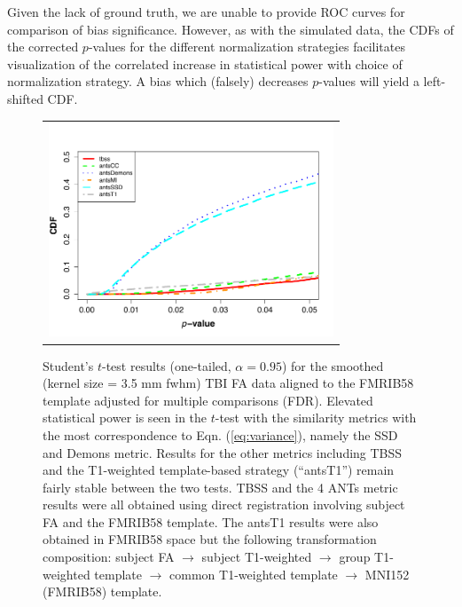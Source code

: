\documentclass[final,5p,times,twocolumn]{elsarticle}
\begin{document}
Given the lack 
of ground truth, we are unable to provide ROC curves for comparison
of bias significance. However, as with the simulated data, the CDFs of the 
corrected $p$-values 
for the different normalization
strategies facilitates visualization of the correlated increase in statistical
power with choice of normalization strategy.
A bias which (falsely) decreases $p$-values will yield a left-shifted
CDF.  


 


\begin{figure}
\begin{center}
\begin{tabular}{c}
  \includegraphics[width=85mm]{tbittest.pdf}
\end{tabular}
\caption{Student's $t$-test results (one-tailed, $\alpha = 0.95$) for the smoothed (kernel size = 3.5 mm fwhm)
TBI FA data aligned to the FMRIB58 template adjusted for multiple comparisons (FDR).  Elevated statistical power is seen in the $t$-test with the similarity metrics with the most correspondence to Eqn. (\ref{eq:variance}), namely the SSD and Demons metric.  Results for the other metrics including TBSS and the T1-weighted template-based strategy (``antsT1'') remain fairly stable between the two tests.    TBSS and the 4 ANTs metric
results were all obtained using direct registration involving subject FA and the FMRIB58 template.  The antsT1 results were also obtained in FMRIB58 space but the following transformation composition: subject FA $\rightarrow$ subject T1-weighted $\rightarrow$ group T1-weighted template $\rightarrow$ 
common T1-weighted template $\rightarrow$ MNI152 (FMRIB58) template.  
}
\label{fig:tbi_testing}
\end{center}        
\end{figure}
\end{document}
